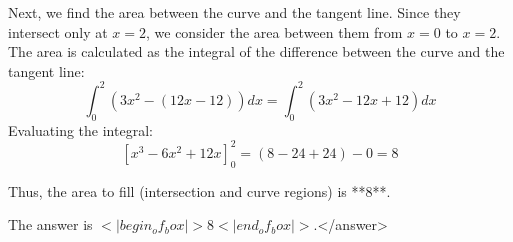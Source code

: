Next, we find the area between the curve and the tangent line. Since they intersect only at \( x = 2 \), we consider the area between them from \( x = 0 \) to \( x = 2 \). The area is calculated as the integral of the difference between the curve and the tangent line:  
\[
\int_0^2 \left(3x^2 - (12x - 12)\right) dx = \int_0^2 (3x^2 - 12x + 12) dx
\]  
Evaluating the integral:  
\[
\left[ x^3 - 6x^2 + 12x \right]_0^2 = (8 - 24 + 24) - 0 = 8
\]  

Thus, the area to fill (intersection and curve regions) is **8**.  

The answer is \(<|begin_of_box|>8<|end_of_box|>\).</answer>